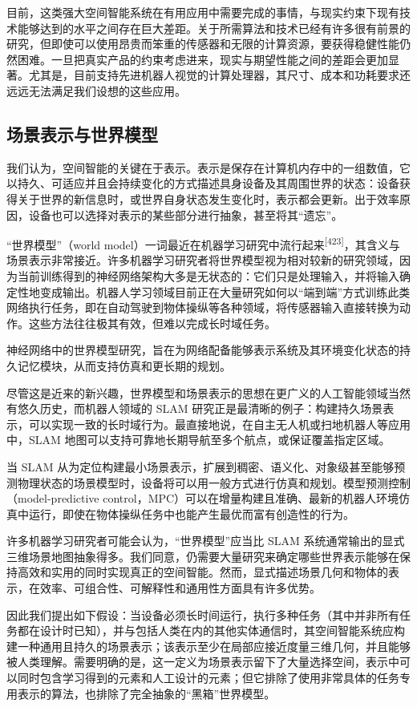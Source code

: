 目前，这类强大空间智能系统在有用应用中需要完成的事情，与现实约束下现有技术能够达到的水平之间存在巨大差距。关于所需算法和技术已经有许多很有前景的研究，但即使可以使用昂贵而笨重的传感器和无限的计算资源，要获得稳健性能仍然困难。一旦把真实产品的约束考虑进来，现实与期望性能之间的差距会更加显著。尤其是，目前支持先进机器人视觉的计算处理器，其尺寸、成本和功耗要求还远远无法满足我们设想的这些应用。

\subsection{场景表示与世界模型}

我们认为，空间智能的关键在于表示。表示是保存在计算机内存中的一组数值，它以持久、可适应并且会持续变化的方式描述具身设备及其周围世界的状态：设备获得关于世界的新信息时，或世界自身状态发生变化时，表示都会更新。出于效率原因，设备也可以选择对表示的某些部分进行抽象，甚至将其“遗忘”。

“世界模型”（world model）一词最近在机器学习研究中流行起来\textsuperscript{[423]}，其含义与场景表示非常接近。许多机器学习研究者将世界模型视为相对较新的研究领域，因为当前训练得到的神经网络架构大多是无状态的：它们只是处理输入，并将输入确定性地变成输出。机器人学习领域目前正在大量研究如何以“端到端”方式训练此类网络执行任务，即在自动驾驶到物体操纵等各种领域，将传感器输入直接转换为动作。这些方法往往极其有效，但难以完成长时域任务。

神经网络中的世界模型研究，旨在为网络配备能够表示系统及其环境变化状态的持久记忆模块，从而支持仿真和更长期的规划。

尽管这是近来的新兴趣，世界模型和场景表示的思想在更广义的人工智能领域当然有悠久历史，而机器人领域的 SLAM 研究正是最清晰的例子：构建持久场景表示，可以实现一致的长时域行为。最直接地说，在自主无人机或扫地机器人等应用中，SLAM 地图可以支持可靠地长期导航至多个航点，或保证覆盖指定区域。

当 SLAM 从为定位构建最小场景表示，扩展到稠密、语义化、对象级甚至能够预测物理状态的场景模型时，设备将可以用一般方式进行仿真和规划。模型预测控制（model-predictive control，MPC）可以在增量构建且准确、最新的机器人环境仿真中运行，即使在物体操纵任务中也能产生最优而富有创造性的行为。

许多机器学习研究者可能会认为，“世界模型”应当比 SLAM 系统通常输出的显式三维场景地图抽象得多。我们同意，仍需要大量研究来确定哪些世界表示能够在保持高效和实用的同时实现真正的空间智能。然而，显式描述场景几何和物体的表示，在效率、可组合性、可解释性和通用性方面具有许多优势。

因此我们提出如下假设：当设备必须长时间运行，执行多种任务（其中并非所有任务都在设计时已知），并与包括人类在内的其他实体通信时，其空间智能系统应构建一种通用且持久的场景表示；该表示至少在局部应接近度量三维几何，并且能够被人类理解。需要明确的是，这一定义为场景表示留下了大量选择空间，表示中可以同时包含学习得到的元素和人工设计的元素；但它排除了使用非常具体的任务专用表示的算法，也排除了完全抽象的“黑箱”世界模型。

